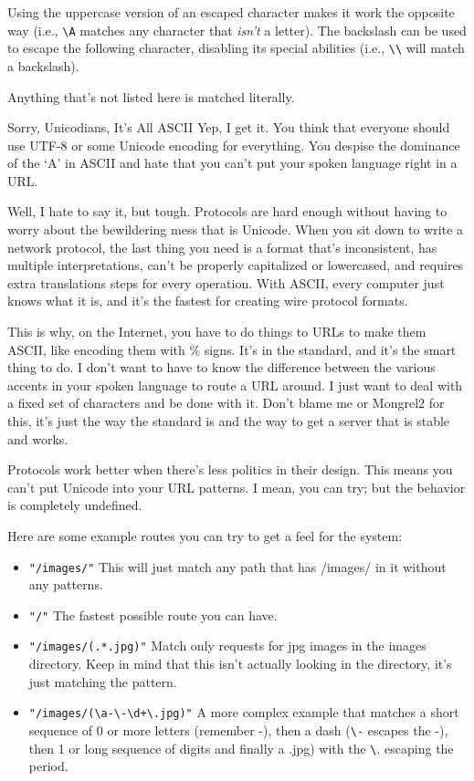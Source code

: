 Using the uppercase version of an escaped character makes it work the opposite
way (i.e., \verb|\A| matches any character that \emph{isn't} a letter). The backslash
can be used to escape the following character, disabling its special abilities (i.e.,
\verb|\\| will match a backslash).

Anything that's not listed here is matched literally.

\begin{aside}{Sorry, Unicodians, It's All ASCII}
Yep, I get it.  You think that everyone should use UTF-8 or some Unicode encoding for everything.
You despise the dominance of the `A' in ASCII and hate that you can't put your spoken language
right in a URL.

Well, I hate to say it, but tough.  Protocols are hard enough without having to
worry about the bewildering mess that is Unicode.  When you sit down to write a
network protocol, the last thing you need is a format that's inconsistent, has
multiple interpretations, can't be properly capitalized or lowercased, and
requires extra translations steps for every operation.  With ASCII, every
computer just knows what it is, and it's the fastest for creating wire protocol
formats.

This is why, on the Internet, you have to do things to URLs to make them ASCII,
like encoding them with \% signs.  It's in the standard, and it's the smart
thing to do.  I don't want to have to know the difference between the various
accents in your spoken language to route a URL around.  I just want to deal
with a fixed set of characters and be done with it.  Don't blame me or Mongrel2
for this, it's just the way the standard is and the way to get a server that is
stable and works.

Protocols work better when there's less politics in their design.  This means
you can't put Unicode into your URL patterns.  I mean, you can try; but the
behavior is completely undefined.

\end{aside}


Here are some example routes you can try to get a feel for the system:

\begin{itemize}
\item \verb|"/images/"|  This will just match any path that has /images/ in it without any patterns.
\item \verb|"/"| The fastest possible route you can have.
\item \verb|"/images/(.*.jpg)"| Match only requests for jpg images in the images directory.  Keep in mind that this
    isn't actually looking in the directory, it's just matching the  pattern.
\item \verb|"/images/(\a-\-\d+\.jpg)"| A more complex example that matches a short sequence of 0 or more letters (remember -), then a dash
    (\verb|\-| escapes the -), then 1 or long sequence of digits and finally a .jpg) with the \verb|\|. escaping the period.
\end{itemize}

